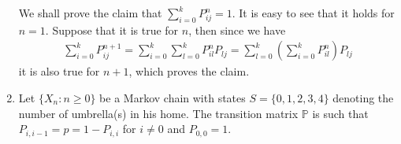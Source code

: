 \documentclass[a4paper,10pt]{article}
\theoremstyle{definition}
\begin{document}
\begin{enumerate}
We shall prove the claim that $\sum^{k}_{i=0}P^n_{ij}=1$. It is easy to see that it holds for $n=1$. Suppose that it is true for $n$, then since we have
\begin{align*}
\sum^{k}_{i=0}P^{n+1}_{ij} = \sum^{k}_{i=0}\sum_{l=0}^{k}P^{n}_{il}P_{lj}= \sum_{l=0}^{k}\left(\sum^{k}_{i=0}P^{n}_{il}\right)P_{lj}
\end{align*}
it is also true for $n+1$, which proves the claim.





\item Let $\{X_n:n\geq 0\}$ be a Markov chain with states $S=\{0,1,2,3,4\}$ denoting the number of umbrella(s) in his home. The transition matrix $\mathbb{P}$ is such that $P_{i,i-1}=p=1-P_{i,i}$ for $i\neq 0$ and $P_{0,0}=1$.



\end{enumerate}
\end{document}
